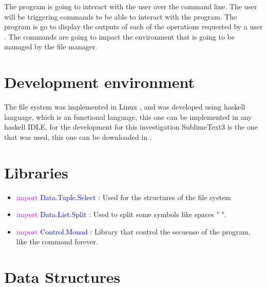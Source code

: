\documentclass{aes2e}
\begin{document}
The program is going to interact with the user over the command line. The user will be triggering commands to be able to interact with the program. The program is go to display the
outputs of each of the operations requested by a user . The commands are going to impact the environment that is going to be managed by the file manager.\cite{DEK2} \newline

\section{Development environment}
The file system was implemented in Linux , and was developed using haskell language, which is an functional language, this one can be implemented in any haskell IDLE, for the development for this investigation SublimeText3 is the one that was used, this one can be downloaded in \cite{DEK5}.\newline\newline



\section{Libraries}
\begin{itemize}
\item{}\textcolor{Magenta}{import} \textcolor{blue} {Data.Tuple.Select} : Used for the structures of the file system\newline

\item{}\textcolor{Magenta}{import} \textcolor{blue} {Data.List.Split} : Used to split some symbols like spaces " ".\newline

\item{}\textcolor{Magenta}{import} \textcolor{blue} {Control.Monad} : Library that control the secuense of the program, like the command forever.\newline

\end{itemize}
\section{Data Structures}


\end{document}
